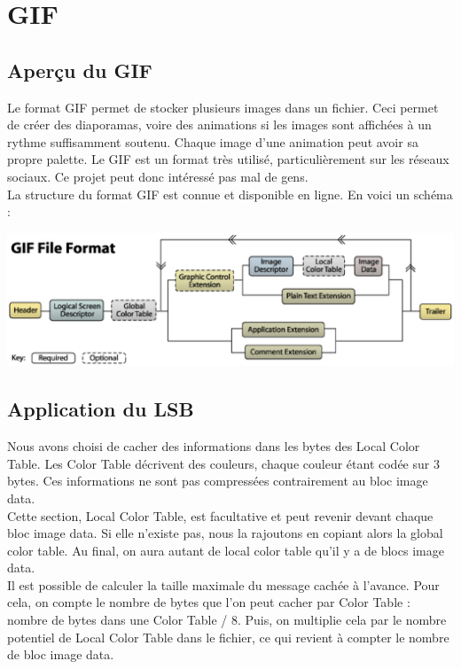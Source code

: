\section{GIF}

\subsection{Aperçu du GIF}
Le format GIF permet de stocker plusieurs images dans un fichier. 
Ceci permet de créer des diaporamas, voire des animations si les images sont affichées à un rythme suffisamment soutenu. 
Chaque image d'une animation peut avoir sa propre palette.
Le GIF est un format très utilisé, particulièrement sur les réseaux sociaux. 
Ce projet peut donc intéressé pas mal de gens.\\
La structure du format GIF est connue et disponible en ligne. En voici un schéma : 

\vspace{1.5cm}

\includegraphics[width=15cm]{gif_structure.eps}


\newpage
\subsection{Application du LSB}
Nous avons choisi de cacher des informations dans les bytes des Local Color Table. 
Les Color Table décrivent des couleurs, chaque couleur étant codée sur 3 bytes. 
Ces informations ne sont pas compressées contrairement au bloc image data.\\

Cette section, Local Color Table, est facultative et peut revenir devant chaque bloc image data. 
Si elle n'existe pas, nous la rajoutons en copiant
alors la global color table.
Au final, on aura autant de local color table qu'il y a de blocs image data.\\

Il est possible de calculer la taille maximale du message cachée à l'avance. 
Pour cela, on compte le nombre de bytes que l'on peut cacher par Color Table : nombre de bytes dans une Color Table / 8.
Puis, on multiplie cela par le nombre potentiel de Local Color Table dans le fichier, ce qui revient à compter le nombre de bloc image data.

\vspace{1.5cm}

